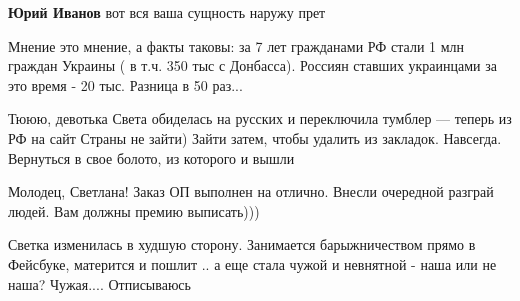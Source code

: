 \begin{itemize}
\begin{itemize}
 
\textbf{Юрий Иванов} вот вся ваша сущность наружу прет
\end{itemize}

 
Мнение это мнение, а факты таковы: за 7 лет гражданами РФ стали 1 млн граждан Украины ( в т.ч. 350 тыс с Донбасса). Россиян ставших украинцами за это время - 20 тыс.
Разница в 50 раз...

 
Тююю, девотька Света обиделась на русских и переключила тумблер — теперь из РФ на сайт Страны не зайти) Зайти затем, чтобы удалить из закладок. Навсегда. Вернуться в свое болото, из которого и вышли

 
Молодец, Светлана! Заказ ОП выполнен на отлично. Внесли очередной разграй людей. Вам должны премию выписать)))

 
Светка изменилась в худшую сторону. Занимается барыжничеством прямо в Фейсбуке,
матерится и пошлит .. а еще стала чужой и невнятной - наша или не наша? Чужая....
Отписываюсь

\begin{itemize}
 

\end{itemize}
\end{itemize}
